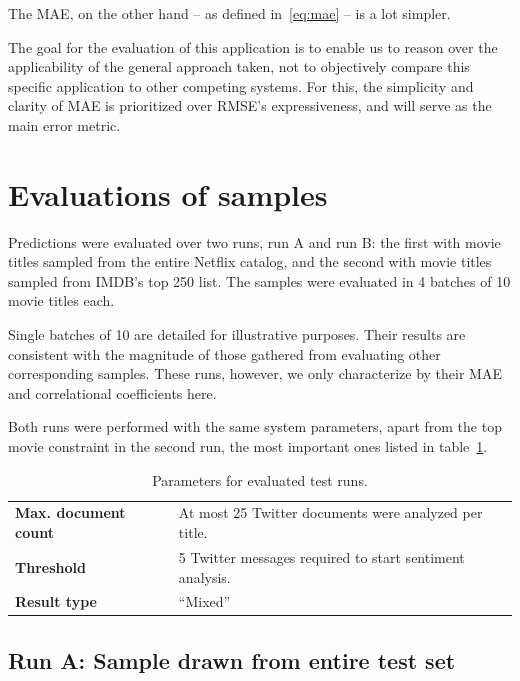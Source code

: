 The MAE, on the other hand -- as defined in~\eqref{eq:mae} -- is a lot simpler.

The goal for the evaluation of this application is to enable us to reason over the applicability of the general approach taken, not to objectively compare this specific application to other competing systems. For this, the simplicity and clarity of MAE is prioritized over RMSE's expressiveness, and will serve as the main error metric.

\section{Evaluations of samples} %
\label{sec:eval_of_samples}

Predictions were evaluated over two runs, run A and run B: the first with movie titles sampled from the entire Netflix catalog, and the second with movie titles sampled from IMDB's top 250 list. The samples were evaluated in 4 batches of 10 movie titles each.

Single batches of 10 are detailed for illustrative purposes. Their results are consistent with the magnitude of those gathered from evaluating other corresponding samples. These runs, however, we only characterize by their MAE and correlational coefficients here.

Both runs were performed with the same system parameters, apart from the top movie constraint in the second run, the most important ones listed in table~\ref{tab:run_parameters}.

\begin{table}[h]
  \begin{center}
    \begin{tabular}{ll}
      \textbf{Max. document count} & At most 25 Twitter documents were analyzed per title. \\
      \textbf{Threshold}           & 5 Twitter messages required to start sentiment analysis. \\
      \textbf{Result type}         & ``Mixed'' \\
    \end{tabular}
  \end{center}
  \caption{Parameters for evaluated test runs.}
  \label{tab:run_parameters}
\end{table}

\subsection{Run A: Sample drawn from entire test set}

